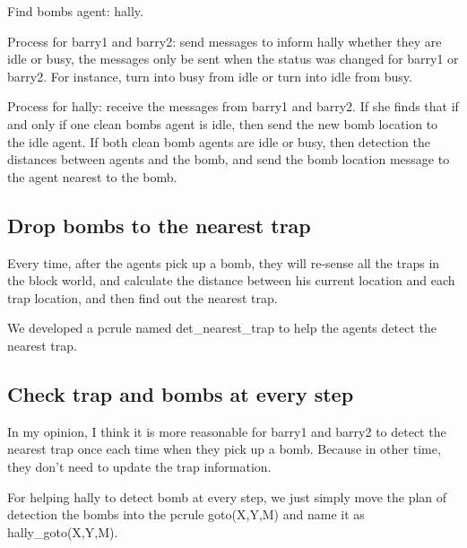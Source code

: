 \documentclass{article}
\begin{document}
Find bombs agent: hally.

Process for barry1 and barry2: send messages to inform hally whether they
are idle or busy, the messages only be sent when the status was changed for
barry1 or barry2. For instance, turn into busy from idle or turn into idle
from busy.

Process for hally: receive the messages from barry1 and barry2.
If she finds that if and only if one clean bombs agent is idle,
then send the new bomb location to the idle agent.
If both clean bomb agents are idle or busy, then detection the distances
between agents and the bomb, and send the bomb location message to the agent
nearest to the bomb.

\subsection{Drop bombs to the nearest trap}
Every time, after the agents pick up a bomb,
they will re-sense all the traps in the block world,
and calculate the distance between his current location and each trap
location, and then find out the nearest trap.

We developed a pcrule named det\_nearest\_trap to help the agents detect the
nearest trap.

\subsection{Check trap and bombs at every step}
In my opinion, I think it is more reasonable for barry1 and barry2 to detect
the nearest trap once each time when they pick up a bomb. Because in other
time, they don't need to update the trap information.

For helping hally to detect bomb at every step, we just simply move the
plan of detection the bombs into the pcrule goto(X,Y,M) and name it as
hally\_goto(X,Y,M).
\end{document}
